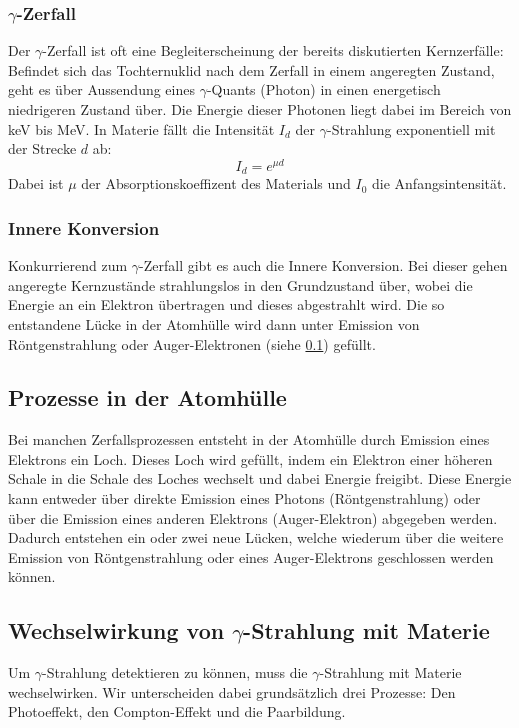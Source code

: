 \documentclass[12pt]{article}
\begin{document}
\subsubsection{$\gamma$-Zerfall}

Der $\gamma$-Zerfall ist oft eine Begleiterscheinung der bereits diskutierten Kernzerfälle: Befindet sich das Tochternuklid nach dem Zerfall in einem angeregten Zustand, geht es über Aussendung eines $\gamma$-Quants (Photon)  in einen energetisch niedrigeren Zustand über. Die Energie dieser Photonen liegt dabei im Bereich von keV bis MeV. In Materie fällt die Intensität $I_d$ der $\gamma$-Strahlung exponentiell mit der Strecke $d$ ab:
\[I_d=e^{\mu d}\]
Dabei ist $\mu$ der Absorptionskoeffizent des Materials und $I_0$ die Anfangsintensität.

\subsubsection{Innere Konversion}
Konkurrierend zum $\gamma$-Zerfall gibt es auch die Innere Konversion. Bei dieser gehen angeregte Kernzustände strahlungslos in den Grundzustand über, wobei die Energie an ein Elektron übertragen und dieses abgestrahlt wird. Die so entstandene Lücke in der Atomhülle wird dann unter Emission von Röntgenstrahlung oder Auger-Elektronen (siehe \ref{auger}) gefüllt.

\subsection{Prozesse in der Atomhülle}\label{auger}
Bei manchen Zerfallsprozessen entsteht in der Atomhülle durch Emission eines Elektrons ein Loch. Dieses Loch wird gefüllt, indem ein Elektron einer höheren Schale in die Schale des Loches wechselt und dabei Energie freigibt. Diese Energie kann entweder über direkte Emission eines Photons (Röntgenstrahlung) oder über die Emission eines anderen Elektrons (Auger-Elektron) abgegeben werden. Dadurch entstehen ein oder zwei neue Lücken, welche wiederum über die weitere Emission von Röntgenstrahlung oder eines Auger-Elektrons geschlossen werden können.

\subsection{Wechselwirkung von $\gamma$-Strahlung mit Materie}
Um $\gamma$-Strahlung detektieren zu können, muss die $\gamma$-Strahlung mit Materie wechselwirken. Wir unterscheiden dabei grundsätzlich drei Prozesse: Den Photoeffekt, den Compton-Effekt und die Paarbildung.
\end{document}

